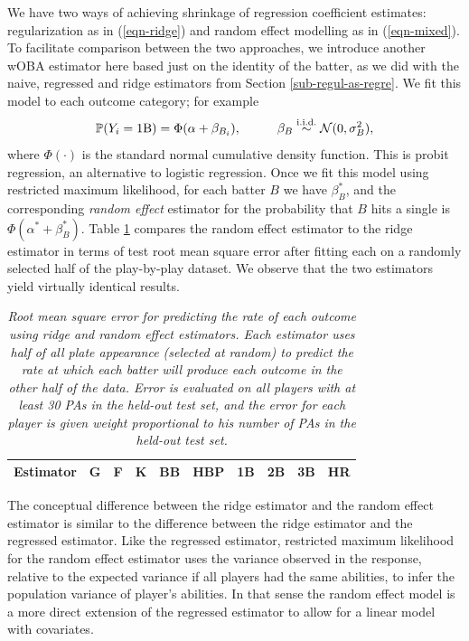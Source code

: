 \documentclass[11pt]{article}
\def\iid{\stackrel{\mbox{\scriptsize i.i.d.}}{\sim}}
\begin{document}
We have two ways of achieving shrinkage of regression coefficient estimates:
regularization as in (\ref{eqn-ridge}) and random effect modelling as in
(\ref{eqn-mixed}). To facilitate comparison between the two approaches, we
introduce another wOBA estimator here based just on the identity of the batter,
as we did with the naive, regressed and ridge estimators from Section
\ref{sub-regul-as-regre}. We fit this model to each outcome category; for
example
\begin{equation}
\label{eqn-random}
\mP(Y_i = \mbox{1B}) = \Phi(\alpha + \beta_{B_i}),\hspace{1cm}
    \beta_B \iid \N(0, \sigma^2_B),
\end{equation}
where $\Phi(\cdot)$ is the standard normal cumulative density function. This is
probit regression, an alternative to logistic regression. Once we fit this
model using restricted maximum likelihood, for each batter $B$ we have
$\beta_B^*$, and the corresponding {\it random effect} estimator for the
probability that $B$ hits a single is $\Phi(\alpha^* + \beta_B^*)$. Table
\ref{tab-regul-vs-rando} compares the random effect estimator to the ridge
estimator in terms of test root mean square error after fitting each on a
randomly selected half of the play-by-play dataset. We observe that the two
estimators yield virtually identical results.

\begin{table}[h]
\centering
\caption{\it Root mean square error for predicting the rate of each outcome
    using ridge and random effect estimators. Each estimator uses half of
    all plate appearance (selected at random) to predict the rate at which each
    batter will produce each outcome in the other half of the data. Error is
    evaluated on all players with at least 30 PAs in the held-out test set, and
    the error for each player is given weight proportional to his number of PAs
    in the held-out test set.}
\begin{tabular}{c|ccccccccc}
Estimator & G & F & K & BB & HBP & 1B & 2B & 3B & HR\\
\hline

\end{tabular}
\label{tab-regul-vs-rando}
\end{table}

The conceptual difference between the ridge estimator and the random effect
estimator is similar to the difference between the ridge estimator and the
regressed estimator. Like the regressed estimator, restricted maximum
likelihood for the random effect estimator uses the variance observed in the
response, relative to the expected variance if all players had the same
abilities, to infer the population variance of player's abilities. In that
sense the random effect model is a more direct extension of the regressed
estimator to allow for a linear model with covariates.
\end{document}
